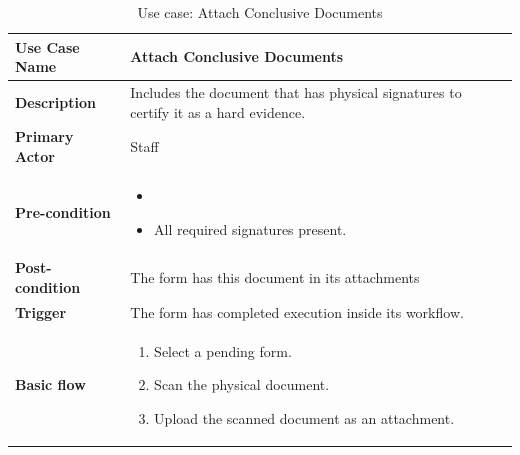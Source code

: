 \begin{table}
	\centering
	\caption{Use case: Attach Conclusive Documents}
	\label{tbl-usecase:attach-conclusive-documents}
	\begin{tabular}{|l|L{9cm}|}
		\hline
		\textbf{Use Case Name} & Attach Conclusive Documents \\
		\hline
		
		\textbf{Description} & Includes the document that has physical signatures to certify it as a hard evidence. \\
		\textbf{Primary Actor} & Staff \\
		\textbf{Pre-condition} & 
		\begin{itemize}
			\item \alreadylogin
			\item All required signatures present.
		\end{itemize} \\
		
		\textbf{Post-condition} & The form has this document in its attachments \\
		\textbf{Trigger} & The form has completed execution inside its workflow. \\
		\textbf{Basic flow} & 
		\begin{enumerate}
			\item Select a pending form.
			\item Scan the physical document.
			\item Upload the scanned document as an attachment.
		\end{enumerate} \\
		\hline
	\end{tabular}
\end{table}